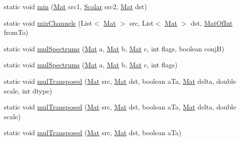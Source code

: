\begin{DoxyCompactItemize}
\item 
static void \mbox{\hyperlink{classorg_1_1opencv_1_1core_1_1_core_a89f8b6dddb1448f5e525dbe8a0a4390f}{min}} (\mbox{\hyperlink{classorg_1_1opencv_1_1core_1_1_mat}{Mat}} src1, \mbox{\hyperlink{classorg_1_1opencv_1_1core_1_1_scalar}{Scalar}} src2, \mbox{\hyperlink{classorg_1_1opencv_1_1core_1_1_mat}{Mat}} dst)
\item 
static void \mbox{\hyperlink{classorg_1_1opencv_1_1core_1_1_core_a812a71941c37c615cb474bff0eacbb2e}{mix\+Channels}} (List$<$ \mbox{\hyperlink{classorg_1_1opencv_1_1core_1_1_mat}{Mat}} $>$ src, List$<$ \mbox{\hyperlink{classorg_1_1opencv_1_1core_1_1_mat}{Mat}} $>$ dst, \mbox{\hyperlink{classorg_1_1opencv_1_1core_1_1_mat_of_int}{Mat\+Of\+Int}} from\+To)
\item 
static void \mbox{\hyperlink{classorg_1_1opencv_1_1core_1_1_core_a249146033929c968ef948e290c2a438c}{mul\+Spectrums}} (\mbox{\hyperlink{classorg_1_1opencv_1_1core_1_1_mat}{Mat}} a, \mbox{\hyperlink{classorg_1_1opencv_1_1core_1_1_mat}{Mat}} b, \mbox{\hyperlink{classorg_1_1opencv_1_1core_1_1_mat}{Mat}} c, int flags, boolean conjB)
\item 
static void \mbox{\hyperlink{classorg_1_1opencv_1_1core_1_1_core_a781f8481b692f31be8a086df59de3eab}{mul\+Spectrums}} (\mbox{\hyperlink{classorg_1_1opencv_1_1core_1_1_mat}{Mat}} a, \mbox{\hyperlink{classorg_1_1opencv_1_1core_1_1_mat}{Mat}} b, \mbox{\hyperlink{classorg_1_1opencv_1_1core_1_1_mat}{Mat}} c, int flags)
\item 
static void \mbox{\hyperlink{classorg_1_1opencv_1_1core_1_1_core_aecfddbae696272a338eb12056603d4e9}{mul\+Transposed}} (\mbox{\hyperlink{classorg_1_1opencv_1_1core_1_1_mat}{Mat}} src, \mbox{\hyperlink{classorg_1_1opencv_1_1core_1_1_mat}{Mat}} dst, boolean a\+Ta, \mbox{\hyperlink{classorg_1_1opencv_1_1core_1_1_mat}{Mat}} delta, double scale, int dtype)
\item 
static void \mbox{\hyperlink{classorg_1_1opencv_1_1core_1_1_core_ac98f79bd02ed3a8202f516f2bf6c0053}{mul\+Transposed}} (\mbox{\hyperlink{classorg_1_1opencv_1_1core_1_1_mat}{Mat}} src, \mbox{\hyperlink{classorg_1_1opencv_1_1core_1_1_mat}{Mat}} dst, boolean a\+Ta, \mbox{\hyperlink{classorg_1_1opencv_1_1core_1_1_mat}{Mat}} delta, double scale)
\item 
static void \mbox{\hyperlink{classorg_1_1opencv_1_1core_1_1_core_a9b09383bb522f3de2ba10c7e406cedec}{mul\+Transposed}} (\mbox{\hyperlink{classorg_1_1opencv_1_1core_1_1_mat}{Mat}} src, \mbox{\hyperlink{classorg_1_1opencv_1_1core_1_1_mat}{Mat}} dst, boolean a\+Ta)
\item 

\end{DoxyCompactItemize}
